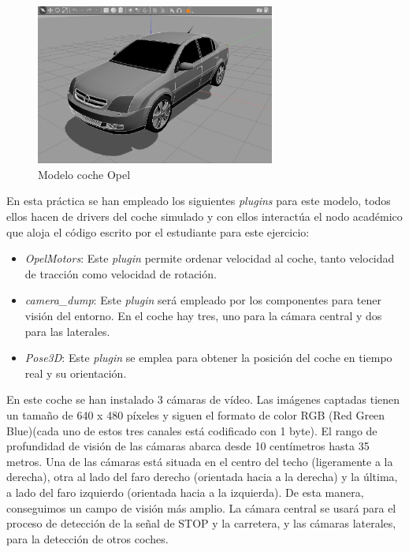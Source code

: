 \begin{figure}[H]
  \begin{center}
    \includegraphics[width=0.7\textwidth]{figures/Stop/cocheOpel.png}
		\caption{Modelo coche Opel}
		\label{fig.cocheOpel}
  \end{center}
\end{figure}

En esta práctica se han empleado los siguientes \textit{plugins} para este modelo, todos ellos hacen de drivers del coche simulado y con ellos interactúa el nodo académico que aloja el código escrito por el estudiante para este ejercicio:

\begin{itemize}
\item	\textit{OpelMotors}: Este \textit{plugin} permite ordenar velocidad al coche, tanto velocidad de tracción como velocidad de rotación.
\item	\textit{camera\_dump}: Este \textit{plugin} será empleado por los componentes para tener visión del entorno. En el coche hay tres, uno para la cámara central y dos para las laterales.
\item	\textit{Pose3D}: Este \textit{plugin} se emplea para obtener la posición del coche en tiempo real y su orientación.
\end{itemize}

En este coche se han instalado 3 cámaras de vídeo. Las imágenes captadas tienen un tamaño de 640 x 480 píxeles y siguen el formato de color RGB (Red Green Blue)(cada uno de estos tres canales está codificado con 1 byte). El rango de profundidad de visión de las cámaras abarca desde 10 centímetros hasta 35 metros. Una de las cámaras está situada en el centro del techo (ligeramente a la derecha), otra al lado del faro derecho (orientada hacia a la derecha) y la última, a lado del faro izquierdo (orientada hacia a la izquierda). De esta manera, conseguimos un campo de visión más amplio. La cámara central se usará para el proceso de detección de la señal de STOP y la carretera, y las cámaras laterales, para la detección de otros coches.

